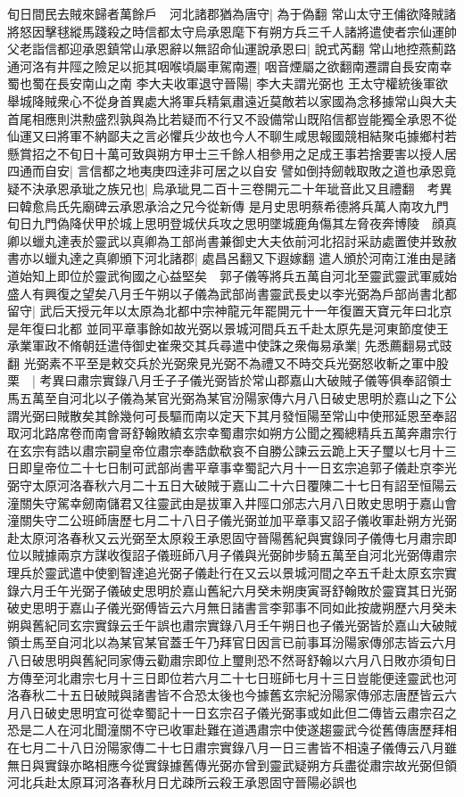 旬日間民去賊來歸者萬餘戶　河北諸郡猶為唐守|{
	為于偽翻}
常山太守王俌欲降賊諸將怒因擊毬縱馬踐殺之時信都太守烏承恩麾下有朔方兵三千人諸將遣使者宗仙運帥父老詣信都迎承恩鎮常山承恩辭以無詔命仙運說承恩曰|{
	說式芮翻}
常山地控燕薊路通河洛有井陘之險足以扼其咽喉頃屬車駕南遷|{
	咽音煙屬之欲翻南遷謂自長安南幸蜀也蜀在長安南山之南}
李大夫收軍退守晉陽|{
	李大夫謂光弼也}
王太守權統後軍欲舉城降賊衆心不從身首異處大將軍兵精氣肅遠近莫敵若以家國為念移據常山與大夫首尾相應則洪勲盛烈孰與為比若疑而不行又不設備常山既陷信都豈能獨全承恩不從仙運又曰將軍不納鄙夫之言必懼兵少故也今人不聊生咸思報國競相結聚屯據鄉村若懸賞招之不旬日十萬可致與朔方甲士三千餘人相參用之足成王事若捨要害以授人居四通而自安|{
	言信都之地夷庚四逹非可居之以自安}
譬如倒持劒戟取敗之道也承恩竟疑不決承恩承玼之族兄也|{
	烏承玼見二百十三卷開元二十年玼音此又且禮翻　考異曰韓愈烏氏先廟碑云承恩承洽之兄今從新傳}
是月史思明蔡希德將兵萬人南攻九門旬日九門偽降伏甲於城上思明登城伏兵攻之思明墜城鹿角傷其左脅夜奔博陵　顔真卿以蠟丸達表於靈武以真卿為工部尚書兼御史大夫依前河北招討采訪處置使并致赦書亦以蠟丸達之真卿頒下河北諸郡|{
	處昌呂翻又下遐嫁翻}
遣人頒於河南江淮由是諸道始知上即位於靈武徇國之心益堅矣　郭子儀等將兵五萬自河北至靈武靈武軍威始盛人有興復之望矣八月壬午朔以子儀為武部尚書靈武長史以李光弼為戶部尚書北都留守|{
	武后天授元年以太原為北都中宗神龍元年罷開元十一年復置天寶元年曰北京是年復曰北都}
並同平章事餘如故光弼以景城河間兵五千赴太原先是河東節度使王承業軍政不脩朝廷遣侍御史崔衆交其兵尋遣中使誅之衆侮易承業|{
	先悉薦翻易式豉翻}
光弼素不平至是敕交兵於光弼衆見光弼不為禮又不時交兵光弼怒收斬之軍中股栗　|{
	考異曰肅宗實錄八月壬子子儀光弼皆於常山郡嘉山大破賊子儀等俱奉詔領士馬五萬至自河北以子儀為某官光弼為某官汾陽家傳六月八日破史思明於嘉山之下公謂光弼曰賊散矣其餘幾何可長驅而南以定天下其月發恒陽至常山中使邢延恩至奉詔取河北路席卷而南會哥舒翰敗績玄宗幸蜀肅宗如朔方公聞之獨總精兵五萬奔肅宗行在玄宗有誥以肅宗嗣皇帝位肅宗奉誥歔欷哀不自勝公諫云云跪上天子璽以七月十三日即皇帝位二十七日制可武部尚書平章事幸蜀記六月十一日玄宗追郭子儀赴京李光弼守太原河洛春秋六月二十五日大破賊于嘉山二十六日覆陳二十七日有詔至恒陽云潼關失守駕幸劒南儲君又往靈武由是拔軍入井陘口邠志六月八日敗史思明于嘉山會潼關失守二公班師唐歷七月二十八日子儀光弼並加平章事又詔子儀收軍赴朔方光弼赴太原河洛春秋又云光弼至太原殺王承恩固守晉陽舊紀與實錄同子儀傳七月肅宗即位以賊據兩京方謀收復詔子儀班師八月子儀與光弼帥步騎五萬至自河北光弼傳肅宗理兵於靈武遣中使劉智達追光弼子儀赴行在又云以景城河間之卒五千赴太原玄宗實錄六月壬午光弼子儀破史思明於嘉山舊紀六月癸未朔庚寅哥舒翰敗於靈寶其日光弼破史思明于嘉山子儀光弼傅皆云六月無日諸書言李郭事不同如此按歲朔歷六月癸未朔與舊紀同玄宗實錄云壬午誤也肅宗實錄八月壬午朔日也子儀光弼皆於嘉山大破賊領士馬至自河北以為某官某官蓋壬午乃拜官日因言已前事耳汾陽家傳邠志皆云六月八日破思明與舊紀同家傳云勸肅宗即位上璽則恐不然哥舒翰以六月八日敗亦須旬日方傳至河北肅宗七月十三日即位若六月二十七日班師七月十三日豈能便逹靈武也河洛春秋二十五日破賊與諸書皆不合恐太後也今據舊玄宗紀汾陽家傳邠志唐歷皆云六月八日破史思明宜可從幸蜀記十一日玄宗召子儀光弼事或如此但二傳皆云肅宗召之恐是二人在河北聞潼關不守已收軍赴難在道遇肅宗中使遂趨靈武今從舊傳唐歷拜相在七月二十八日汾陽家傳二十七日肅宗實錄八月一日三書皆不相遠子儀傳云八月雖無日與實錄亦略相應今從實錄據舊傳光弼亦曾到靈武疑朔方兵盡從肅宗故光弼但領河北兵赴太原耳河洛春秋月日尤疎所云殺王承恩固守晉陽必誤也}
